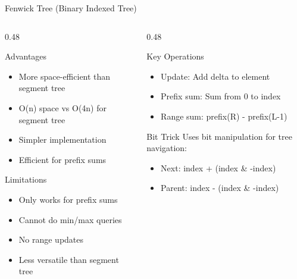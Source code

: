 \documentclass[aspectratio=169,xcolor=dvipsnames]{beamer}
\begin{document}
\begin{frame}{Fenwick Tree (Binary Indexed Tree)}
  \begin{columns}
    \begin{column}{0.48\textwidth}
      \begin{block}{Advantages}
        \begin{itemize}
          \item More space-efficient than segment tree
          \item O(n) space vs O(4n) for segment tree
          \item Simpler implementation
          \item Efficient for prefix sums
        \end{itemize}
      \end{block}

      \begin{block}{Limitations}
        \begin{itemize}
          \item Only works for prefix sums
          \item Cannot do min/max queries
          \item No range updates
          \item Less versatile than segment tree
        \end{itemize}
      \end{block}
    \end{column}
    \begin{column}{0.48\textwidth}
      \begin{block}{Key Operations}
        \begin{itemize}
          \item Update: Add delta to element
          \item Prefix sum: Sum from 0 to index
          \item Range sum: prefix(R) - prefix(L-1)
        \end{itemize}
      \end{block}

      \begin{exampleblock}{Bit Trick}
        Uses bit manipulation for tree navigation:
        \begin{itemize}
          \item Next: index + (index \& -index)
          \item Parent: index - (index \& -index)
        \end{itemize}
      \end{exampleblock}
    \end{column}
  \end{columns}
\end{frame}
\end{document}

